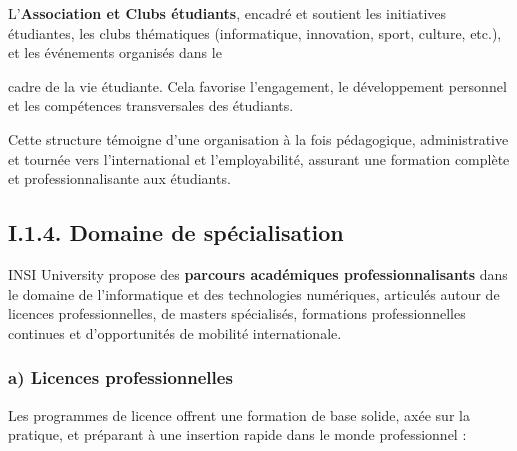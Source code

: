 L'\textbf{Association et Clubs étudiants}, encadré et soutient les initiatives étudiantes, les clubs thématiques (informatique, innovation, sport, culture, etc.), et les événements organisés dans le

cadre de la vie étudiante. Cela favorise l'engagement, le développement personnel et les compétences transversales des étudiants.

Cette structure témoigne d'une organisation à la fois pédagogique, administrative et tournée vers l'international et l'employabilité, assurant une formation complète et professionnalisante aux étudiants.

\subsection{I.1.4. Domaine de spécialisation}

INSI University propose des \textbf{parcours académiques professionnalisants} dans le domaine de l'informatique et des technologies numériques, articulés autour de licences professionnelles, de masters spécialisés, formations professionnelles continues et d'opportunités de mobilité internationale.

\subsubsection*{a) Licences professionnelles}

Les programmes de licence offrent une formation de base solide, axée sur la pratique, et préparant à une insertion rapide dans le monde professionnel :



